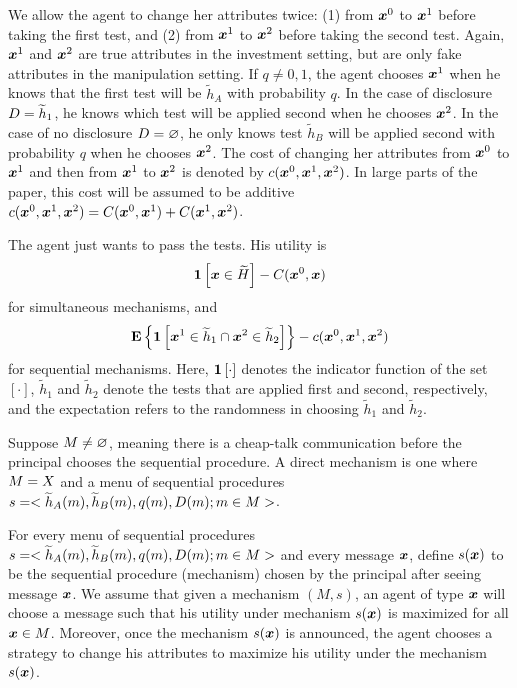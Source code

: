 We allow the agent to change her attributes twice: (1) from $\boldsymbol{x}^0$ to $\boldsymbol{x}^1$
before taking the first test, and (2) from $\boldsymbol{x}^1$ to $\boldsymbol{x}^2$ before taking
the second test. Again, $\boldsymbol{x}^1$ and $\boldsymbol{x}^2$ are true attributes in the
investment setting, but are only fake attributes in the manipulation setting.
If $q\neq 0,1$, the agent  chooses $\boldsymbol{x}^1$ when he knows that the first test will be $\widetilde{h}_{A}$
with probability $q$. 
In the case of disclosure $D=\widetilde{h}_{1}$, he knows which test will be applied
second when he chooses $\boldsymbol{x}^2$. 
In the case of no disclosure $D=\varnothing$, he only knows  test  $\widetilde{h}_{B}$ will be applied
second with probability $q$ when he chooses $\boldsymbol{x}^2$.
The cost of changing her attributes from $\boldsymbol{x}^0
$ to $\boldsymbol{x}^1$ and then from $\boldsymbol{x}^1$ to $\boldsymbol{x}^2$ is denoted by $%
\cost(\orifeatures,\firstfeatures,\secondfeatures)$. In large parts of the paper, this cost will be
assumed to be additive $c(\boldsymbol{x}^0,\boldsymbol{x}^1,\boldsymbol{x}^2)= C(\boldsymbol{x}^0,\boldsymbol{x}^1)+C(\boldsymbol{x}^1,\boldsymbol{x}^2)$.

The agent just wants to pass the tests.
His utility is 
\[
{\bf 1}\left[\boldsymbol{x}\in \widetilde{H}\right]-C(\boldsymbol{x}^0,\boldsymbol{x})
\]%
for simultaneous mechanisms, and 
        \[
\mathbf{E}\left\{{\bf 1}\left[\boldsymbol{x}^1\in \widetilde h_{1}\cap \boldsymbol{x}^2\in \widetilde  h_{2}\right]\right\}
-c(\boldsymbol{x}^0,\boldsymbol{x}^1,\boldsymbol{x}^2)
\]%
for sequential mechanisms. Here, ${\bf 1}\left[\cdot\right]$ denotes the
indicator function of the set $[ \cdot ]$, $ \widetilde h_{1}$ and $ \widetilde h_{2}$ denote the
tests that are applied first and second, respectively, and the expectation
refers to the randomness in choosing $ \widetilde h_{1}$ and $ \widetilde h_{2}$.

Suppose $M\neq\varnothing$, meaning there is a cheap-talk communication before the principal chooses the sequential procedure. A direct mechanism is one where $M=X$ and a menu of sequential procedures $s=<\widetilde{h}_{A}(m),\widetilde{h}_{B}(m),q(m),D(m); m\in M>$. 

 For every menu of sequential procedures $s=<\widetilde{h}_{A}(m),\widetilde{h}_{B}(m),q(m),D(m); m\in M>$ and every message $\boldsymbol{x}$, define $s(\boldsymbol{x})$ to be the sequential procedure (mechanism) chosen by the principal after seeing message $\boldsymbol{x}$.
 We assume that given a mechanism $(M,s)$, an agent of type $\boldsymbol{x}$ will choose a message such that  his utility under mechanism $s(\boldsymbol{x})$ is maximized for all $\boldsymbol{x}\in M$.
 Moreover, once the mechanism $s(\boldsymbol{x})$ is announced, the agent chooses a strategy to change his attributes to maximize his utility under the mechanism $s(\boldsymbol{x})$.
 
